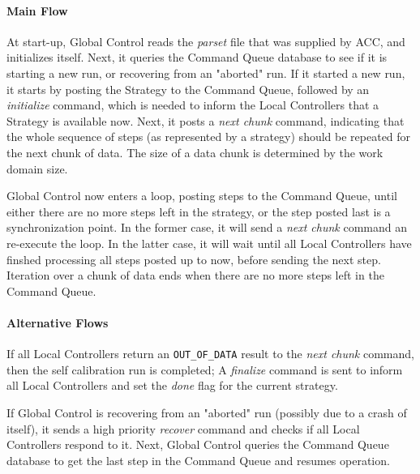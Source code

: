 \documentclass[10pt]{lofar}
\begin{document}
\paragraph*{Main Flow}
At start-up, Global Control reads the \emph{parset} file that was supplied by
ACC, and initializes itself. Next, it queries the Command Queue database to
see if it is starting a new run, or recovering from an "aborted" run. If it
started a new run, it starts by posting the Strategy to the Command Queue,
followed by an \textit{initialize} command, which is needed to inform the
Local Controllers that a Strategy is available now. Next, it posts a
\textit{next chunk} command, indicating that the whole sequence of steps (as
represented by a strategy) should be repeated for the next chunk of data. The
size of a data chunk is determined by the work domain size.

Global Control now enters a loop, posting steps to the Command Queue, until
either there are no more steps left in the strategy, or the step posted last
is a synchronization point. In the former case, it will send a \textit{next
chunk} command an re-execute the loop. In the latter case, it will wait until
all Local Controllers have finshed processing all steps posted up to now,
before sending the next step. Iteration over a chunk of data ends when there
are no more steps left in the Command Queue.

\paragraph*{Alternative Flows}
If all Local Controllers return an \texttt{OUT\_OF\_DATA} result to the
\textit{next chunk} command, then the self calibration run is completed; A
\textit{finalize} command is sent to inform all Local Controllers and set the
\textit{done} flag for the current strategy.

If Global Control is recovering from an "aborted" run (possibly due to a crash
of itself), it sends a high priority \textit{recover} command and checks if
all Local Controllers respond to it. Next, Global Control queries the Command
Queue database to get the last step in the Command Queue and resumes
operation.
\end{document}
